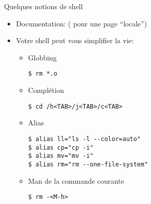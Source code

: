 \begin{frame}[fragile=singleslide]{Quelques notions de shell}
  \begin{itemize}
  \item   Documentation:    (  pour   une  page
    ``locale'')
  \item Votre shell peut vous simplifier la vie:
    \begin{itemize}
    \item Globbing
\begin{lstlisting}
$ rm *.o
\end{lstlisting}
    \item Complétion 
\begin{lstlisting}
$ cd /h<TAB>/j<TAB>/c<TAB>
\end{lstlisting}
    \item Alias
\begin{lstlisting}
$ alias ll="ls -l --color=auto"
$ alias cp="cp -i"              
$ alias mv="mv -i"              
$ alias rm="rm --one-file-system"
\end{lstlisting} %
    \item Man de la commande courante
\begin{lstlisting}
$ rm -<M-h>
\end{lstlisting} %
    \end{itemize}
  \end{itemize}
\end{frame}


